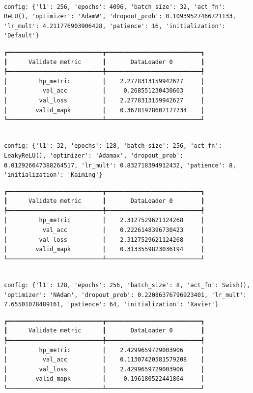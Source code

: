 \documentclass[
  letterpaper,
  DIV=11,
  numbers=noendperiod]{scrreprt}
\begin{document}
\begin{verbatim}

config: {'l1': 256, 'epochs': 4096, 'batch_size': 32, 'act_fn': ReLU(), 'optimizer': 'AdamW', 'dropout_prob': 0.10939527466721133, 'lr_mult': 4.211776903906428, 'patience': 16, 'initialization': 'Default'}
\end{verbatim}

\begin{verbatim}
┏━━━━━━━━━━━━━━━━━━━━━━━━━━━┳━━━━━━━━━━━━━━━━━━━━━━━━━━━┓
┃      Validate metric      ┃       DataLoader 0        ┃
┡━━━━━━━━━━━━━━━━━━━━━━━━━━━╇━━━━━━━━━━━━━━━━━━━━━━━━━━━┩
│         hp_metric         │    2.2778313159942627     │
│          val_acc          │     0.268551230430603     │
│         val_loss          │    2.2778313159942627     │
│        valid_mapk         │    0.36781978607177734    │
└───────────────────────────┴───────────────────────────┘
\end{verbatim}

\begin{verbatim}

config: {'l1': 32, 'epochs': 128, 'batch_size': 256, 'act_fn': LeakyReLU(), 'optimizer': 'Adamax', 'dropout_prob': 0.012926647388264517, 'lr_mult': 0.832718394912432, 'patience': 8, 'initialization': 'Kaiming'}
\end{verbatim}

\begin{verbatim}
┏━━━━━━━━━━━━━━━━━━━━━━━━━━━┳━━━━━━━━━━━━━━━━━━━━━━━━━━━┓
┃      Validate metric      ┃       DataLoader 0        ┃
┡━━━━━━━━━━━━━━━━━━━━━━━━━━━╇━━━━━━━━━━━━━━━━━━━━━━━━━━━┩
│         hp_metric         │    2.3127529621124268     │
│          val_acc          │    0.2226148396730423     │
│         val_loss          │    2.3127529621124268     │
│        valid_mapk         │    0.3133559823036194     │
└───────────────────────────┴───────────────────────────┘
\end{verbatim}

\begin{verbatim}

config: {'l1': 128, 'epochs': 256, 'batch_size': 8, 'act_fn': Swish(), 'optimizer': 'NAdam', 'dropout_prob': 0.22086376796923401, 'lr_mult': 7.65501078489161, 'patience': 64, 'initialization': 'Xavier'}
\end{verbatim}

\begin{verbatim}
┏━━━━━━━━━━━━━━━━━━━━━━━━━━━┳━━━━━━━━━━━━━━━━━━━━━━━━━━━┓
┃      Validate metric      ┃       DataLoader 0        ┃
┡━━━━━━━━━━━━━━━━━━━━━━━━━━━╇━━━━━━━━━━━━━━━━━━━━━━━━━━━┩
│         hp_metric         │    2.4299659729003906     │
│          val_acc          │    0.11307420581579208    │
│         val_loss          │    2.4299659729003906     │
│        valid_mapk         │     0.196180522441864     │
└───────────────────────────┴───────────────────────────┘
\end{verbatim}
\end{document}

